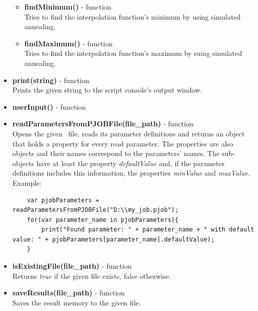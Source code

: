 \begin{itemize}
\begin{itemize}
		\item \textbf{findMinimum()} - function\\
		Tries to find the interpolation function's minimum by using simulated annealing.
		
		\item \textbf{findMaximum()} - function\\
		Tries to find the interpolation function's maximum by suing simulated annealing.
	\end{itemize}
	
	\item \textbf{print(string)} - function\\
	Prints the given string to the script console's output window.
	
	\item \textbf{userInput()} - function\\
	
	
	\item \textbf{readParametersFromPJOBFile(file\_path)} - function\\
	Opens the given \PJOB\ file, reads its parameter definitions and returns an object
	that holds a property for every read parameter.
	The properties are also objects and their names correspond to the parameters' names.
	The sub-objects have at least the property \textit{defaultValue} and, if the parameter definitions includes this information,
	the properties \textit{minValue} and \textit{maxValue}.
	Example:
	\begin{lstlisting}
	var pjobParameters = readParametersFromPJOBFile("D:\\my_job.pjob");
	for(var parameter_name in pjobParameters){
		print("Found parameter: " + parameter_name + " with default value: " + pjobParameters[parameter_name].defaultValue);
	}
	\end{lstlisting}
	
	
	\item \textbf{isExistingFile(file\_path)} - function\\
	Returns \textit{true} if the given file exists, false otherwise.
	
	\item \textbf{saveResults(file\_path)} - function\\
	Saves the result memory to the given file.
	
	
\end{itemize}


